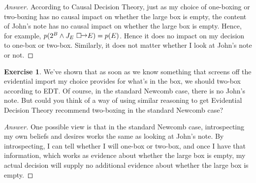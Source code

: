 \documentclass[11pt]{article}
\theoremstyle{definition}
\newtheorem{exer}{Exercise}
\newcommand{\counterfactual}{\ensuremath{%
  \Box\kern-1.5pt
  \raise1pt\hbox{$\mathord{\rightarrow}$}}}
\begin{document}
\begin{proof}[Answer]
According to Causal Decision Theory, just as my choice of one-boxing or two-boxing has no causal impact on whether the large box is empty, the content of John's note has no causal impact on whether the large box is empty. Hence, for example, $p(2^B \land J_E \, \, \counterfactual E) = p(E)$. Hence it does no impact on my decision to one-box or two-box. Similarly, it does not matter whether I look at John's note or not.

\end{proof}

\begin{exer}
We've shown that as soon as we know something that screens off the evidential import my choice provides for what's in the box, we should two-box according to EDT. Of course, in the standard Newcomb case, there is no John's note. But could you think of a way of using similar reasoning to get Evidential Decision Theory recommend two-boxing in the standard Newcomb case?

\end{exer}

\begin{proof}[Answer]
One possible view is that in the standard Newcomb case, introspecting my own beliefs and desires works the same as looking at John's note. By introspecting, I can tell whether I will one-box or two-box, and once I have that information, which works as evidence about whether the large box is empty, my actual decision will supply no additional evidence about whether the large box is empty.

\end{proof}
\end{document}
